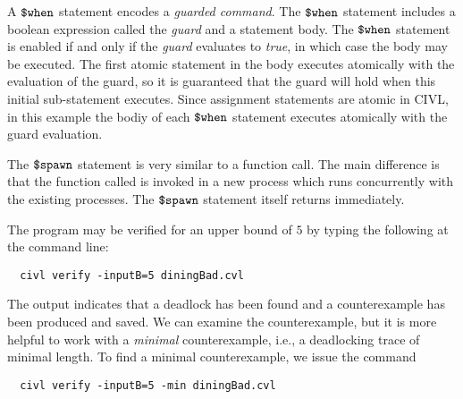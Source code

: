 A $\mbox{\texttt{\${}when}}$ statement encodes a \emph{guarded command}. The $\mbox{\texttt{\${}when}}$
statement includes a boolean expression called the \emph{guard} and a
statement body. The $\mbox{\texttt{\${}when}}$ statement is enabled if and only if the
\emph{guard} evaluates to \emph{true}, in which case the body may be
executed. The first atomic statement in the body executes atomically
with the evaluation of the guard, so it is guaranteed that the guard
will hold when this initial sub-statement executes. Since assignment
statements are atomic in CIVL, in this example the bodiy of each
$\mbox{\texttt{\${}when}}$ statement executes atomically with the guard evaluation.

The $\mbox{\texttt{\${}spawn}}$ statement is very similar to a function call. The main
difference is that the function called is invoked in a new process
which runs concurrently with the existing processes. The $\mbox{\texttt{\${}spawn}}$
statement itself returns immediately.

The program may be verified for an upper bound of $5$ by typing the
following at the command line:
\begin{verbatim}
  civl verify -inputB=5 diningBad.cvl
\end{verbatim}

The output indicates that a deadlock has been found and a
counterexample has been produced and saved. We can examine the
counterexample, but it is more helpful to work with a \emph{minimal}
counterexample, i.e., a deadlocking trace of minimal length. To find a
minimal counterexample, we issue the command

\begin{verbatim}
  civl verify -inputB=5 -min diningBad.cvl
\end{verbatim}

